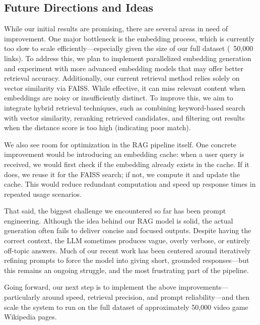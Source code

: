 \documentclass[fleqn,moreauthors,10pt]{ds_report}
\begin{document}
\subsection*{Future Directions and Ideas}
While our initial results are promising, there are several areas in need of improvement. One major bottleneck is the embedding process, which is currently too slow to scale efficiently—especially given the size of our full dataset (~50,000 links). To address this, we plan to implement parallelized embedding generation and experiment with more advanced embedding models that may offer better retrieval accuracy. Additionally, our current retrieval method relies solely on vector similarity via FAISS. While effective, it can miss relevant content when embeddings are noisy or insufficiently distinct. To improve this, we aim to integrate hybrid retrieval techniques, such as combining keyword-based search with vector similarity, reranking retrieved candidates, and filtering out results when the distance score is too high (indicating poor match).

We also see room for optimization in the RAG pipeline itself. One concrete improvement would be introducing an embedding cache: when a user query is received, we would first check if the embedding already exists in the cache. If it does, we reuse it for the FAISS search; if not, we compute it and update the cache. This would reduce redundant computation and speed up response times in repeated usage scenarios.

That said, the biggest challenge we encountered so far has been prompt engineering. Although the idea behind our RAG model is solid, the actual generation often fails to deliver concise and focused outputs. Despite having the correct context, the LLM sometimes produces vague, overly verbose, or entirely off-topic answers. Much of our recent work has been centered around iteratively refining prompts to force the model into giving short, grounded responses—but this remains an ongoing struggle, and the most frustrating part of the pipeline.

Going forward, our next step is to implement the above improvements—particularly around speed, retrieval precision, and prompt reliability—and then scale the system to run on the full dataset of approximately 50,000 video game Wikipedia pages.


\end{document}
